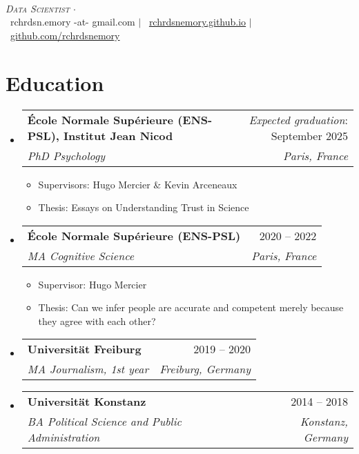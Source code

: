 \documentclass[letterpaper,11pt]{article}
\makeatletter
\newcommand{\resumeItem}[1]{
  \item\small{
    {#1 \vspace{-2pt}}
  }
}
\newcommand{\resumeSubheading}[4]{
  \vspace{1pt}\item
    \begin{tabular*}{0.97\textwidth}[t]{l@{\extracolsep{\fill}}r}
      \textbf{#1} & #2 \\
      \textit{\small#3} & \textit{\small #4} \\
    \end{tabular*}\vspace{-7pt}
}
\newcommand{\resumeSubHeadingListStart}{\begin{itemize}[leftmargin=0.15in, label={}]}
\newcommand{\resumeSubHeadingListEnd}{\end{itemize}}
\newcommand{\resumeItemListStart}{\begin{itemize}}
\newcommand{\resumeItemListEnd}{\end{itemize}\vspace{-5pt}}
\makeatother
\begin{document}

\begin{center}
     \\ \vspace{1pt}
    \textit{\scshape Data Scientist $\cdot$} \\ \vspace{1pt}
    \small 
    \faEnvelope\ rchrdsn.emory -at- gmail.com $|$ 
    \faHome\ \href{https://github.com/rchrdsnemory}{rchrdsnemory.github.io} $|$
    \faGithub\ \href{https://github.com/rchrdsnemory}{github.com/rchrdsnemory}
\end{center}



\section{Education}
  \resumeSubHeadingListStart
    \resumeSubheading
      {École Normale Supérieure (ENS-PSL), Institut Jean Nicod}{\textit{Expected graduation}: September 2025}
      {PhD Psychology}{Paris, France}
            \resumeItemListStart
        \resumeItem{Supervisors: Hugo Mercier \& Kevin Arceneaux}
        \resumeItem{Thesis: Essays on Understanding Trust in Science}
      \resumeItemListEnd
    \resumeSubheading
      {École Normale Supérieure (ENS-PSL)}{2020 -- 2022}
      {MA Cognitive Science}{Paris, France}
            \resumeItemListStart
        \resumeItem{Supervisor: Hugo Mercier}            
        \resumeItem{Thesis: Can we infer people are accurate and competent merely because they agree with each other?}
      \resumeItemListEnd
    \resumeSubheading
      {Universität Freiburg}{2019 -- 2020}
      {MA Journalism, 1st year}{Freiburg, Germany} 
    \resumeSubheading
      {Universität Konstanz}{2014 -- 2018}
      {BA Political Science and Public Administration}{Konstanz, Germany}
  \resumeSubHeadingListEnd
\end{document}
